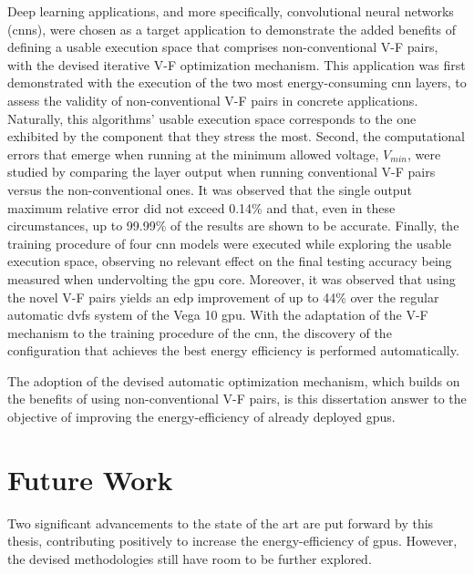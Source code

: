 Deep learning applications, and more specifically, convolutional neural networks (\acrshort{cnn}s), were chosen as a target application to demonstrate the added benefits of defining a usable execution space that comprises non-conventional V-F pairs, with the devised iterative V-F optimization mechanism.
This application was first demonstrated with the execution of the two most energy-consuming \acrshort{cnn} layers, to assess the validity of non-conventional V-F pairs in concrete applications. Naturally, this algorithms' usable execution space corresponds to the one exhibited by the component that they stress the most. Second, the computational errors that emerge when running at the minimum allowed voltage, $V_{min}$, were studied by comparing the layer output when running conventional V-F pairs versus the non-conventional ones. It was observed that the single output maximum relative error did not exceed 0.14\% and that, even in these circumstances, up to 99.99\% of the results are shown to be accurate. Finally, the training procedure of four \acrshort{cnn} models were executed while exploring the usable execution space, observing no relevant effect on the final testing accuracy being measured when undervolting the \acrshort{gpu} core. Moreover, it was observed that using the novel V-F pairs yields an \acrshort{edp} improvement of up to 44\% over the regular automatic  \acrshort{dvfs} system of the Vega 10  \acrshort{gpu}. 
With the adaptation of the V-F mechanism to the training procedure of the \acrshort{cnn}, the discovery of the configuration that achieves the best energy efficiency is performed automatically. 

The adoption of the devised automatic optimization mechanism, which builds on the benefits of using non-conventional V-F pairs, is this dissertation answer to the objective of improving the energy-efficiency of already deployed \acrshort{gpu}s.






\section{Future Work}
\label{section:future}

Two significant advancements to the state of the art are put forward by this thesis, contributing positively to increase the energy-efficiency of \acrshort{gpu}s. However, the devised methodologies still have room to be further explored.

